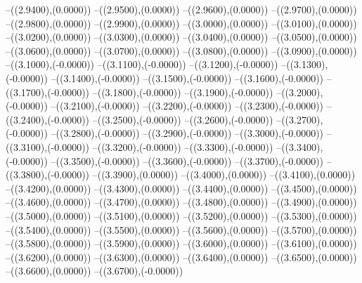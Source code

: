 {	--({\sx*(2.9400)},{\sy*(0.0000)})
	--({\sx*(2.9500)},{\sy*(0.0000)})
	--({\sx*(2.9600)},{\sy*(0.0000)})
	--({\sx*(2.9700)},{\sy*(0.0000)})
	--({\sx*(2.9800)},{\sy*(0.0000)})
	--({\sx*(2.9900)},{\sy*(0.0000)})
	--({\sx*(3.0000)},{\sy*(0.0000)})
	--({\sx*(3.0100)},{\sy*(0.0000)})
	--({\sx*(3.0200)},{\sy*(0.0000)})
	--({\sx*(3.0300)},{\sy*(0.0000)})
	--({\sx*(3.0400)},{\sy*(0.0000)})
	--({\sx*(3.0500)},{\sy*(0.0000)})
	--({\sx*(3.0600)},{\sy*(0.0000)})
	--({\sx*(3.0700)},{\sy*(0.0000)})
	--({\sx*(3.0800)},{\sy*(0.0000)})
	--({\sx*(3.0900)},{\sy*(0.0000)})
	--({\sx*(3.1000)},{\sy*(-0.0000)})
	--({\sx*(3.1100)},{\sy*(-0.0000)})
	--({\sx*(3.1200)},{\sy*(-0.0000)})
	--({\sx*(3.1300)},{\sy*(-0.0000)})
	--({\sx*(3.1400)},{\sy*(-0.0000)})
	--({\sx*(3.1500)},{\sy*(-0.0000)})
	--({\sx*(3.1600)},{\sy*(-0.0000)})
	--({\sx*(3.1700)},{\sy*(-0.0000)})
	--({\sx*(3.1800)},{\sy*(-0.0000)})
	--({\sx*(3.1900)},{\sy*(-0.0000)})
	--({\sx*(3.2000)},{\sy*(-0.0000)})
	--({\sx*(3.2100)},{\sy*(-0.0000)})
	--({\sx*(3.2200)},{\sy*(-0.0000)})
	--({\sx*(3.2300)},{\sy*(-0.0000)})
	--({\sx*(3.2400)},{\sy*(-0.0000)})
	--({\sx*(3.2500)},{\sy*(-0.0000)})
	--({\sx*(3.2600)},{\sy*(-0.0000)})
	--({\sx*(3.2700)},{\sy*(-0.0000)})
	--({\sx*(3.2800)},{\sy*(-0.0000)})
	--({\sx*(3.2900)},{\sy*(-0.0000)})
	--({\sx*(3.3000)},{\sy*(-0.0000)})
	--({\sx*(3.3100)},{\sy*(-0.0000)})
	--({\sx*(3.3200)},{\sy*(-0.0000)})
	--({\sx*(3.3300)},{\sy*(-0.0000)})
	--({\sx*(3.3400)},{\sy*(-0.0000)})
	--({\sx*(3.3500)},{\sy*(-0.0000)})
	--({\sx*(3.3600)},{\sy*(-0.0000)})
	--({\sx*(3.3700)},{\sy*(-0.0000)})
	--({\sx*(3.3800)},{\sy*(-0.0000)})
	--({\sx*(3.3900)},{\sy*(0.0000)})
	--({\sx*(3.4000)},{\sy*(0.0000)})
	--({\sx*(3.4100)},{\sy*(0.0000)})
	--({\sx*(3.4200)},{\sy*(0.0000)})
	--({\sx*(3.4300)},{\sy*(0.0000)})
	--({\sx*(3.4400)},{\sy*(0.0000)})
	--({\sx*(3.4500)},{\sy*(0.0000)})
	--({\sx*(3.4600)},{\sy*(0.0000)})
	--({\sx*(3.4700)},{\sy*(0.0000)})
	--({\sx*(3.4800)},{\sy*(0.0000)})
	--({\sx*(3.4900)},{\sy*(0.0000)})
	--({\sx*(3.5000)},{\sy*(0.0000)})
	--({\sx*(3.5100)},{\sy*(0.0000)})
	--({\sx*(3.5200)},{\sy*(0.0000)})
	--({\sx*(3.5300)},{\sy*(0.0000)})
	--({\sx*(3.5400)},{\sy*(0.0000)})
	--({\sx*(3.5500)},{\sy*(0.0000)})
	--({\sx*(3.5600)},{\sy*(0.0000)})
	--({\sx*(3.5700)},{\sy*(0.0000)})
	--({\sx*(3.5800)},{\sy*(0.0000)})
	--({\sx*(3.5900)},{\sy*(0.0000)})
	--({\sx*(3.6000)},{\sy*(0.0000)})
	--({\sx*(3.6100)},{\sy*(0.0000)})
	--({\sx*(3.6200)},{\sy*(0.0000)})
	--({\sx*(3.6300)},{\sy*(0.0000)})
	--({\sx*(3.6400)},{\sy*(0.0000)})
	--({\sx*(3.6500)},{\sy*(0.0000)})
	--({\sx*(3.6600)},{\sy*(0.0000)})
	--({\sx*(3.6700)},{\sy*(-0.0000)})
}
